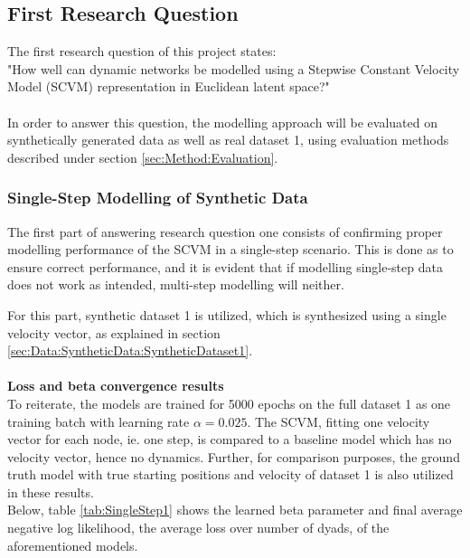 \subsection{First Research Question}
\label{sec:ResearchQuestion1}
The first research question of this project states:
\\
"How well can dynamic networks be modelled using a Stepwise Constant Velocity Model (SCVM) representation in Euclidean latent space?"
\\\\
In order to answer this question, the modelling approach will be evaluated on synthetically generated data as well as real dataset 1, using evaluation methods described under section \ref{sec:Method:Evaluation}.


\subsubsection{Single-Step Modelling of Synthetic Data}
\label{sec:ResearchQuestion1:singleStepSynthetic}
The first part of answering research question one consists of confirming proper modelling performance of the SCVM in a single-step scenario.
This is done as to ensure correct performance, and it is evident that if modelling single-step data does not work as intended, multi-step modelling will neither.

For this part, synthetic dataset 1 is utilized, which is synthesized using a single velocity vector, as explained in section \ref{sec:Data:SyntheticData:SyntheticDataset1}.
\\\\
\textbf{Loss and beta convergence results}
\\
To reiterate, the models are trained for 5000 epochs on the full dataset 1 as one training batch with learning rate $\alpha = 0.025$. 
The SCVM, fitting one velocity vector for each node, ie. one step, is compared to a baseline model which has no velocity vector, hence no dynamics. 
Further, for comparison purposes, the ground truth model with true starting positions and velocity of dataset 1 is also utilized in these results.
\\
Below, table \ref{tab:SingleStep1} shows the learned beta parameter and final average negative log likelihood, the average loss over number of dyads, of the aforementioned models.

